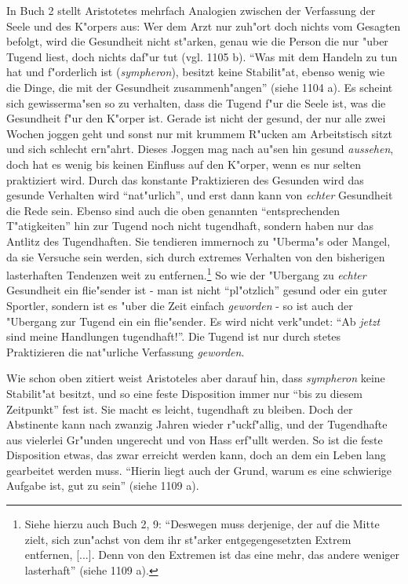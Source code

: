 \documentclass[a4paper, emulatestandardclasses, 12pt]{scrartcl}
\begin{document}
\begin{onehalfspace}
In Buch 2 stellt Aristotetes mehrfach Analogien zwischen der Verfassung der Seele und des K"orpers aus: Wer dem Arzt nur zuh"ort doch nichts vom Gesagten befolgt, wird die Gesundheit nicht st"arken, genau wie die Person die nur "uber Tugend liest, doch nichts daf"ur tut (vgl. 1105 b). "`Was mit dem Handeln zu tun hat und f"orderlich ist (\emph{sympheron}), besitzt keine Stabilit"at, ebenso wenig wie die Dinge, die mit der Gesundheit zusammenh"angen"' (siehe 1104 a). Es scheint sich gewisserma"sen so zu verhalten, dass die Tugend f"ur die Seele ist, was die Gesundheit f"ur den K"orper ist. Gerade ist nicht der gesund, der nur alle zwei Wochen joggen geht und sonst nur mit krummem R"ucken am Arbeitstisch sitzt und sich schlecht ern"ahrt. Dieses Joggen mag nach au"sen hin gesund \emph{aussehen}, doch hat es wenig bis keinen Einfluss auf den K"orper, wenn es nur selten praktiziert wird. Durch das konstante Praktizieren des Gesunden wird das gesunde Verhalten wird "`nat"urlich"', und erst dann kann von \emph{echter} Gesundheit die Rede sein. Ebenso sind auch die oben genannten "`entsprechenden T"atigkeiten"' hin zur Tugend noch nicht tugendhaft, sondern haben nur das Antlitz des Tugendhaften. Sie tendieren immernoch zu "Uberma"s oder Mangel, da sie Versuche sein werden, sich durch extremes Verhalten von den bisherigen lasterhaften Tendenzen weit zu entfernen.\footnote{Siehe hierzu auch Buch 2, 9: "`Deswegen muss derjenige, der auf die Mitte zielt, sich zun"achst von dem ihr st"arker entgegengesetzten Extrem entfernen, [...]. Denn von den Extremen ist das eine mehr, das andere weniger lasterhaft"' (siehe 1109 a).} So wie der "Ubergang zu \emph{echter} Gesundheit ein flie"sender ist - man ist nicht "`pl"otzlich"' gesund oder ein guter Sportler, sondern ist es "uber die Zeit einfach \emph{geworden} - so ist auch der "Ubergang zur Tugend ein ein flie"sender. Es wird nicht verk"undet: "`Ab \emph{jetzt} sind meine Handlungen tugendhaft!"'. Die Tugend ist nur durch stetes Praktizieren die nat"urliche Verfassung \emph{geworden}.

Wie schon oben zitiert weist Aristoteles aber darauf hin, dass \emph{sympheron} keine Stabilit"at besitzt, und so eine feste Disposition immer nur "`bis zu diesem Zeitpunkt"' fest ist. Sie macht es leicht, tugendhaft zu bleiben. Doch der Abstinente kann nach zwanzig Jahren wieder r"uckf"allig, und der Tugendhafte aus vielerlei Gr"unden ungerecht und von Hass erf"ullt werden. So ist die feste Disposition etwas, das zwar erreicht werden kann, doch an dem ein Leben lang gearbeitet werden muss. "`Hierin liegt auch der Grund, warum es eine schwierige Aufgabe ist, gut zu sein"' (siehe 1109 a).


\vspace{5mm}
\vspace{3mm}

\end{onehalfspace}
\nocite{*}

\end{document}
